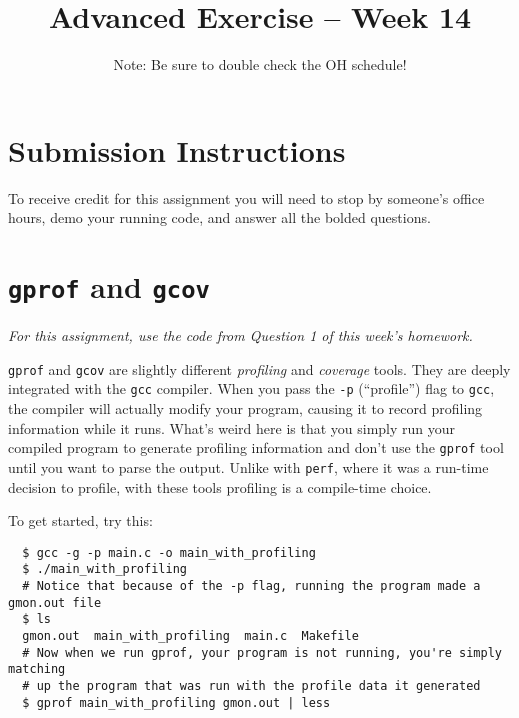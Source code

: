 \documentclass{article}
\begin{document}
\fancyfoot[C]{\color{gray} \thepage~/~\pageref*{LastPage}}
\pagestyle{fancyplain}


\title{\textbf{Advanced Exercise -- Week 14\\}}
\author{\textbf{\color{red}{Due: Before April 18, 10:00PM}}}
\date{Note: Be sure to double check the OH schedule!}
\maketitle


\section*{Submission Instructions}
To receive credit for this assignment you will need to stop by someone's
office hours, demo your running code, and answer all the bolded questions.

\section*{\texttt{gprof} and \texttt{gcov}}

\emph{For this assignment, use the code from Question 1 of this week's
  homework.}

\texttt{gprof} and \texttt{gcov} are slightly different \emph{profiling} and
\emph{coverage} tools. They are deeply integrated with the \texttt{gcc}
compiler. When you pass the \texttt{-p} (``profile'') flag to \texttt{gcc},
the compiler will actually modify your program, causing it to record profiling
information while it runs. What's weird here is that you simply run your
compiled program to generate profiling information and don't use the
\texttt{gprof} tool until you want to parse the output. Unlike with
\texttt{perf}, where it was a run-time decision to profile, with these tools
profiling is a compile-time choice.

To get started, try this:
\begin{verbatim}
  $ gcc -g -p main.c -o main_with_profiling
  $ ./main_with_profiling
  # Notice that because of the -p flag, running the program made a gmon.out file
  $ ls
  gmon.out  main_with_profiling  main.c  Makefile
  # Now when we run gprof, your program is not running, you're simply matching
  # up the program that was run with the profile data it generated
  $ gprof main_with_profiling gmon.out | less
\end{verbatim}
\end{document}
